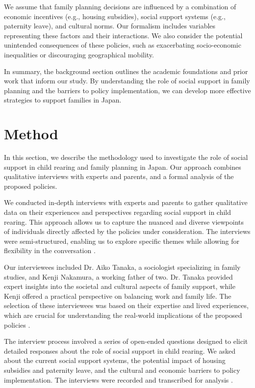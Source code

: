 \documentclass{article} %
\begin{document}
We assume that family planning decisions are influenced by a combination of economic incentives (e.g., housing subsidies), social support systems (e.g., paternity leave), and cultural norms. Our formalism includes variables representing these factors and their interactions. We also consider the potential unintended consequences of these policies, such as exacerbating socio-economic inequalities or discouraging geographical mobility.

In summary, the background section outlines the academic foundations and prior work that inform our study. By understanding the role of social support in family planning and the barriers to policy implementation, we can develop more effective strategies to support families in Japan.

\section{Method}
\label{sec:method}
In this section, we describe the methodology used to investigate the role of social support in child rearing and family planning in Japan. Our approach combines qualitative interviews with experts and parents, and a formal analysis of the proposed policies.

We conducted in-depth interviews with experts and parents to gather qualitative data on their experiences and perspectives regarding social support in child rearing. This approach allows us to capture the nuanced and diverse viewpoints of individuals directly affected by the policies under consideration. The interviews were semi-structured, enabling us to explore specific themes while allowing for flexibility in the conversation \citep{park2023generative}.

Our interviewees included Dr. Aiko Tanaka, a sociologist specializing in family studies, and Kenji Nakamura, a working father of two. Dr. Tanaka provided expert insights into the societal and cultural aspects of family support, while Kenji offered a practical perspective on balancing work and family life. The selection of these interviewees was based on their expertise and lived experiences, which are crucial for understanding the real-world implications of the proposed policies \citep{shanahan2023role}.

The interview process involved a series of open-ended questions designed to elicit detailed responses about the role of social support in child rearing. We asked about the current social support systems, the potential impact of housing subsidies and paternity leave, and the cultural and economic barriers to policy implementation. The interviews were recorded and transcribed for analysis \citep{liu2023agentbench}.
\end{document}
